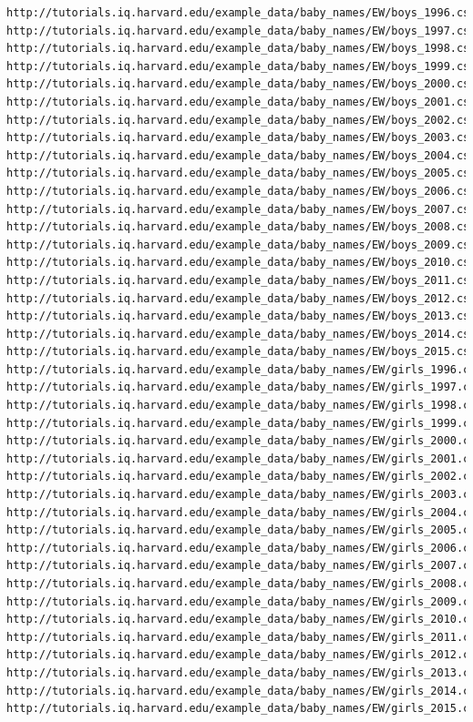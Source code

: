 \documentclass[
]{book}
\begin{document}
\begin{verbatim}
http://tutorials.iq.harvard.edu/example_data/baby_names/EW/boys_1996.csv
http://tutorials.iq.harvard.edu/example_data/baby_names/EW/boys_1997.csv
http://tutorials.iq.harvard.edu/example_data/baby_names/EW/boys_1998.csv
http://tutorials.iq.harvard.edu/example_data/baby_names/EW/boys_1999.csv
http://tutorials.iq.harvard.edu/example_data/baby_names/EW/boys_2000.csv
http://tutorials.iq.harvard.edu/example_data/baby_names/EW/boys_2001.csv
http://tutorials.iq.harvard.edu/example_data/baby_names/EW/boys_2002.csv
http://tutorials.iq.harvard.edu/example_data/baby_names/EW/boys_2003.csv
http://tutorials.iq.harvard.edu/example_data/baby_names/EW/boys_2004.csv
http://tutorials.iq.harvard.edu/example_data/baby_names/EW/boys_2005.csv
http://tutorials.iq.harvard.edu/example_data/baby_names/EW/boys_2006.csv
http://tutorials.iq.harvard.edu/example_data/baby_names/EW/boys_2007.csv
http://tutorials.iq.harvard.edu/example_data/baby_names/EW/boys_2008.csv
http://tutorials.iq.harvard.edu/example_data/baby_names/EW/boys_2009.csv
http://tutorials.iq.harvard.edu/example_data/baby_names/EW/boys_2010.csv
http://tutorials.iq.harvard.edu/example_data/baby_names/EW/boys_2011.csv
http://tutorials.iq.harvard.edu/example_data/baby_names/EW/boys_2012.csv
http://tutorials.iq.harvard.edu/example_data/baby_names/EW/boys_2013.csv
http://tutorials.iq.harvard.edu/example_data/baby_names/EW/boys_2014.csv
http://tutorials.iq.harvard.edu/example_data/baby_names/EW/boys_2015.csv
http://tutorials.iq.harvard.edu/example_data/baby_names/EW/girls_1996.csv
http://tutorials.iq.harvard.edu/example_data/baby_names/EW/girls_1997.csv
http://tutorials.iq.harvard.edu/example_data/baby_names/EW/girls_1998.csv
http://tutorials.iq.harvard.edu/example_data/baby_names/EW/girls_1999.csv
http://tutorials.iq.harvard.edu/example_data/baby_names/EW/girls_2000.csv
http://tutorials.iq.harvard.edu/example_data/baby_names/EW/girls_2001.csv
http://tutorials.iq.harvard.edu/example_data/baby_names/EW/girls_2002.csv
http://tutorials.iq.harvard.edu/example_data/baby_names/EW/girls_2003.csv
http://tutorials.iq.harvard.edu/example_data/baby_names/EW/girls_2004.csv
http://tutorials.iq.harvard.edu/example_data/baby_names/EW/girls_2005.csv
http://tutorials.iq.harvard.edu/example_data/baby_names/EW/girls_2006.csv
http://tutorials.iq.harvard.edu/example_data/baby_names/EW/girls_2007.csv
http://tutorials.iq.harvard.edu/example_data/baby_names/EW/girls_2008.csv
http://tutorials.iq.harvard.edu/example_data/baby_names/EW/girls_2009.csv
http://tutorials.iq.harvard.edu/example_data/baby_names/EW/girls_2010.csv
http://tutorials.iq.harvard.edu/example_data/baby_names/EW/girls_2011.csv
http://tutorials.iq.harvard.edu/example_data/baby_names/EW/girls_2012.csv
http://tutorials.iq.harvard.edu/example_data/baby_names/EW/girls_2013.csv
http://tutorials.iq.harvard.edu/example_data/baby_names/EW/girls_2014.csv
http://tutorials.iq.harvard.edu/example_data/baby_names/EW/girls_2015.csv
\end{verbatim}
\end{document}
